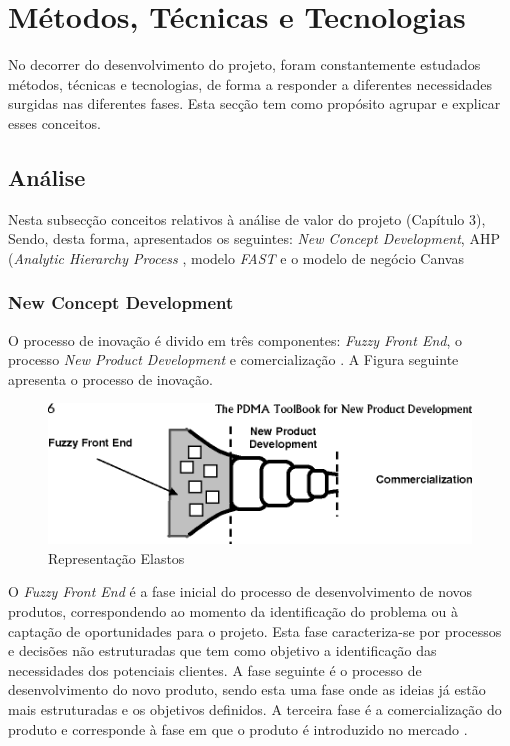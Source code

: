 \section{Métodos, Técnicas e Tecnologias}
No decorrer do desenvolvimento do projeto, foram constantemente estudados métodos, técnicas e tecnologias, de forma a responder a diferentes necessidades surgidas nas diferentes fases. Esta secção tem como propósito agrupar e explicar esses conceitos.

\subsection{Análise}
Nesta subsecção conceitos relativos à análise de valor do projeto (Capítulo 3), Sendo, desta forma, apresentados os seguintes: \emph{New Concept Development}, AHP (\emph{Analytic Hierarchy  Process} \label{sym:AHP}, modelo \emph{FAST} e o modelo de negócio Canvas

\subsubsection{New Concept Development}
O processo de inovação é divido em três componentes: \emph{Fuzzy
Front End}, o processo \emph{New Product Development} e comercialização \cite{fuzzy_frontend}. A Figura seguinte
apresenta o processo de inovação.

\begin{figure}[h]
    \begin{center}
    \includegraphics[width=1\textwidth]{figures/new_product_development.png}
    \caption{Representação Elastos}
    \end{center}
\end{figure}

O \emph{Fuzzy Front End} é a fase inicial do processo de desenvolvimento de novos produtos, correspondendo ao momento da identificação do problema ou à captação de oportunidades para o
projeto. Esta fase caracteriza-se por processos e decisões não estruturadas que tem como objetivo a identificação das necessidades dos potenciais clientes. A fase seguinte é o processo de  desenvolvimento do novo produto, sendo esta uma fase onde as ideias já estão mais estruturadas e os objetivos definidos. A terceira fase é a comercialização
do produto e corresponde à fase em que o produto é introduzido no mercado \cite{fuzzy_frontend}.

